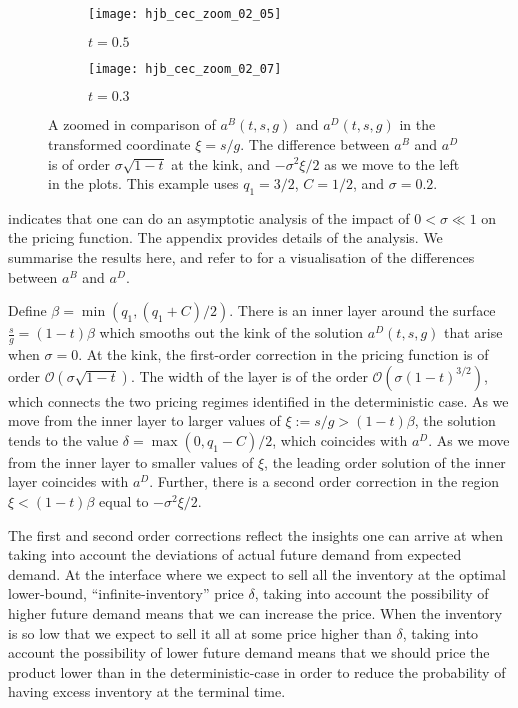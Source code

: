 \documentclass[main.tex]{subfiles}
\begin{document}
\begin{figure}[hbt]
  \centering
  \begin{subfigure}[b]{0.5\textwidth}
    \texttt{[image: hjb\_cec\_zoom\_02\_05]}
    \caption{$t = 0.5$}
  \end{subfigure}%
  \begin{subfigure}[b]{0.5\textwidth}
    \texttt{[image: hjb\_cec\_zoom\_02\_07]}
    \caption{$t=0.3$}
  \end{subfigure}
  \caption{A zoomed in comparison of $a^B(t,s,g)$ and $a^D(t,s,g)$
    in the transformed coordinate $\xi=s/g$.
    The difference between $a^B$ and $a^D$ is of order
    $\sigma\sqrt{1-t}$ at the kink, and
    $-\sigma^2\xi/2$ as we move to the left in the
    plots.
    This example uses $q_1=3/2$, $C=1/2$, and $\sigma=0.2$.
  }\label{fig:hjb_cec_zoom}
\end{figure}
 indicates that one can do an asymptotic analysis
of the impact of $0<\sigma \ll 1$ on the pricing function. The
appendix provides details of the analysis. We summarise the
results here, and refer to  for a visualisation
of the differences between $a^B$ and $a^D$.
\begin{myresult}\label{res:linear_asymptotics}
  Define $\beta=\min(q_1,(q_1+C)/2)$.
  There is an inner layer around the surface $\frac{s}{g}=(1-t)\beta$ which
  smooths out the kink of the solution $a^D(t,s,g)$ that arise when
  $\sigma=0$. At the kink, the first-order correction in the pricing
  function is of order $\mathcal{O}(\sigma\sqrt{1-t})$.
  The width of the layer is of the order
  $\mathcal{O}(\sigma{(1-t)}^{3/2})$, which connects the two pricing
  regimes identified in the deterministic case.
  As we move from the inner layer to larger values of
  $\xi:=s/g>(1-t)\beta$, the solution
  tends to the value $\delta=\max(0,q_1-C)/2$, which coincides with
  $a^D$. As we move from the inner layer to smaller values of $\xi$,
  the leading order solution of the inner layer coincides with $a^D$.
  Further, there is a second order correction in the region
  $\xi<(1-t)\beta$ equal to $-\sigma^2 \xi/2$.
\end{myresult}

The first and second order corrections reflect the insights one can
arrive at when taking into account the deviations of actual future
demand from expected demand.
At the interface where we expect to sell all the inventory at the
optimal lower-bound, ``infinite-inventory'' price $\delta$, taking
into account the possibility of higher future demand means that we can
increase the price.
When the inventory is so low that we expect to sell it all at some
price higher than $\delta$, taking into account the possibility
of lower future demand means that we should price the product lower than in the
deterministic-case in order to
reduce the probability of having excess inventory at the terminal time.
\end{document}
